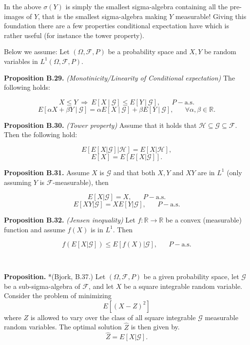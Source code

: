 \documentclass[
]{article}
\begin{document}
In the above \(\sigma(Y)\) is simply the smallest sigma-algebra
containing all the pre-images of \(Y\), that is the smallest
sigma-algebra making \(Y\) measurable! Giving this foundation there are
a few properties conditional expectation have which is rather useful
(for instance the tower property).

Below we assume: Let \((\Omega,\mathcal{F},P)\) be a probability space
and \(X,Y\) be random variables in \(L^1(\Omega,\mathcal{F},P)\).

\textbf{Proposition B.29.} \emph{(Monotinicity/Linearity of Conditional
expectation)} The following holds:

\[X\le Y\ \Rightarrow\ E[X\ \vert\ \mathcal{G}]\le E[Y\ \vert\ \mathcal{G}],\hspace{20pt}P-\text{a.s.}\]
\[E[\alpha X + \beta Y\ \vert\ \mathcal{G}]=\alpha E[X\ \vert\ \mathcal{G}]+ \beta E[Y\ \vert\ \mathcal{G}],\hspace{20pt}\forall \alpha,\beta\in\mathbb{R}.\]

\textbf{Proposition B.30.} \emph{(Tower property)} Assume that it holds
that \(\mathcal{H}\subseteq\mathcal{G}\subseteq\mathcal{F}\). Then the
following hold:

\[E[E[X\vert \mathcal{G}]\vert\mathcal{H}]=E[X\vert \mathcal{H}],\]
\[E[X]=E[E[X\vert \mathcal{G}]].\]

\textbf{Proposition B.31.} Assume \(X\) is \(\mathcal{G}\) and that both
\(X,Y\) and \(XY\) are in \(L^1\) (only assuming \(Y\) is
\(\mathcal{F}\)-measurable), then

\[E[X\vert\mathcal{G}]=X,\hspace{20pt}P-\text{a.s.}\]
\[E[XY\vert\mathcal{G}]=XE[Y\vert\mathcal{G}],\hspace{20pt}P-\text{a.s.}\]

\textbf{Proposition B.32.} \emph{(Jensen inequality)} Let
\(f:\mathbb{R}\to\mathbb{R}\) be a convex (measurable) function and
assume \(f(X)\) is in \(L^1\). Then

\[f(E[X\vert\mathcal{G}])\le E[f(X)\vert\mathcal{G}],\hspace{20pt}P-\text{a.s.}\]

~

\textbf{Proposition.} *(Bjork, B.37.) Let \((\Omega,\mathcal{F},P)\) be
a given probability space, let \(\mathcal{G}\) be a sub-sigma-algebra of
\(\mathcal{F}\), and let \(X\) be a square integrable random variable.
Consider the problem of minimizing \[E\left[(X-Z)^2\right]\] where \(Z\)
is allowed to vary over the class of all square integrable
\(\mathcal{G}\) measurable random variables. The optimal solution
\(\hat{Z}\) is then given by. \[\hat{Z}=E[X\vert\mathcal{G}].\]
\end{document}
